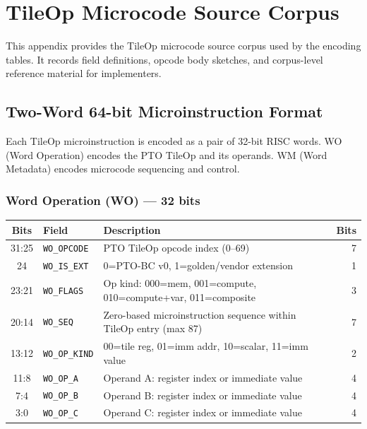 \chapter{TileOp Microcode Source Corpus}
This appendix provides the TileOp microcode source corpus used by the encoding tables. It records field definitions, opcode body sketches, and corpus-level reference material for implementers.

\section{Two-Word 64-bit Microinstruction Format}

Each TileOp microinstruction is encoded as a pair of 32-bit RISC words. WO (Word Operation) encodes the PTO TileOp and its operands. WM (Word Metadata) encodes microcode sequencing and control.

\subsection{Word Operation (WO) --- 32 bits}

\begin{center}
\begin{tabular}{cllr}
\toprule
Bits & Field & Description & Bits \\
\midrule
31:25 & \texttt{WO\_OPCODE} & PTO TileOp opcode index (0--69) & 7 \\
24 & \texttt{WO\_IS\_EXT} & 0=PTO-BC v0, 1=golden/vendor extension & 1 \\
23:21 & \texttt{WO\_FLAGS} & Op kind: 000=mem, 001=compute, 010=compute+var, 011=composite & 3 \\
20:14 & \texttt{WO\_SEQ} & Zero-based microinstruction sequence within TileOp entry (max 87) & 7 \\
13:12 & \texttt{WO\_OP\_KIND} & 00=tile reg, 01=imm addr, 10=scalar, 11=imm value & 2 \\
11:8 & \texttt{WO\_OP\_A} & Operand A: register index or immediate value & 4 \\
7:4 & \texttt{WO\_OP\_B} & Operand B: register index or immediate value & 4 \\
3:0 & \texttt{WO\_OP\_C} & Operand C: register index or immediate value & 4 \\
\bottomrule
\end{tabular}
\end{center}

